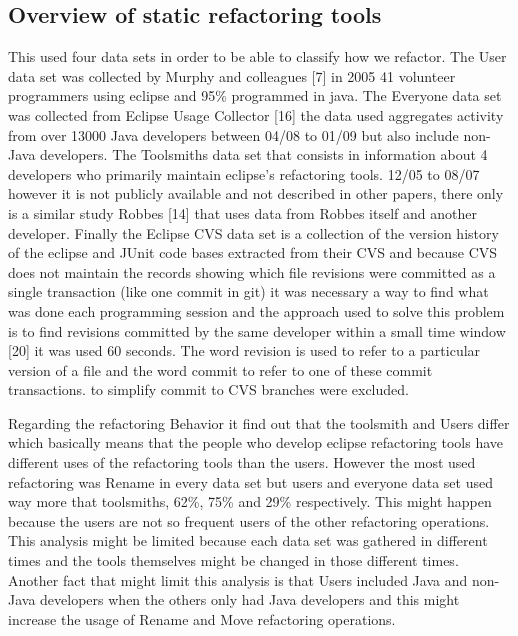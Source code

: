 \subsection{Overview of static refactoring tools}
This used four data sets in order to be able to classify how we refactor. The User data set was collected by Murphy and colleagues [7] in 2005 41 volunteer programmers using eclipse and 95\% programmed in java. %
The Everyone data set was collected from Eclipse Usage Collector [16] the data used aggregates activity from over 13000 Java developers between 04/08 to 01/09 but also include non-Java developers. The Toolsmiths data set that consists in information about 4 developers who primarily maintain eclipse's refactoring tools. 12/05 to 08/07 however it is not publicly available and not described in other papers, there only is a similar study Robbes [14] that uses data from Robbes itself and another developer. Finally the Eclipse CVS data set is a collection of the version history of the eclipse and JUnit code bases extracted from their CVS and because CVS does not maintain the records showing which file revisions were committed as a single transaction (like one commit in git) it was necessary a way to find what was done each programming session and the approach used to solve this problem is to find revisions committed by the same developer within a small time window [20] it was used 60 seconds. The word revision is used to refer to a particular version of a file and the word commit to refer to one of these commit transactions. to simplify commit to CVS branches were excluded.


Regarding the refactoring Behavior it find out that the toolsmith and Users differ which basically means that the people who develop eclipse refactoring tools have different uses of the refactoring tools than the users. However the most used refactoring was Rename in every data set but users and everyone data set used way more that toolsmiths, 62\%, 75\% and 29\% respectively. This might happen because the users are not so frequent users of the other refactoring operations. This analysis might be limited because each data set was gathered in different times and the tools themselves might be changed in those different times. Another fact that might limit this analysis is that Users included Java and non-Java developers when the others only had Java developers and this might increase the usage of Rename and Move refactoring operations.

